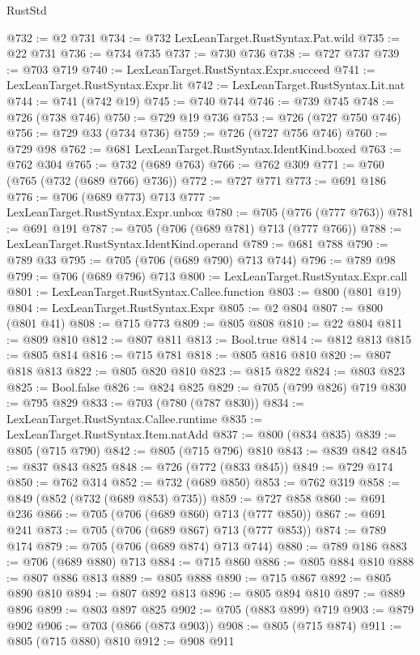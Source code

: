 \begin{lexlean}{RustStd}
\begin{coremodule}
@732 := @2 @731
@734 := @732 LexLeanTarget.RustSyntax.Pat.wild
@735 := @22 @731
@736 := @734 @735
@737 := @730 @736
@738 := @727 @737
@739 := @703 @719
@740 := LexLeanTarget.RustSyntax.Expr.succeed
@741 := LexLeanTarget.RustSyntax.Expr.lit
@742 := LexLeanTarget.RustSyntax.Lit.nat
@744 := @741 (@742 @19)
@745 := @740 @744
@746 := @739 @745
@748 := @726 (@738 @746)
@750 := @729 @19 @736
@753 := @726 (@727 @750 @746)
@756 := @729 @33 (@734 @736)
@759 := @726 (@727 @756 @746)
@760 := @729 @98
@762 := @681 LexLeanTarget.RustSyntax.IdentKind.boxed
@763 := @762 @304
@765 := @732 (@689 @763)
@766 := @762 @309
@771 := @760 (@765 (@732 (@689 @766) @736))
@772 := @727 @771
@773 := @691 @186
@776 := @706 (@689 @773) @713
@777 := LexLeanTarget.RustSyntax.Expr.unbox
@780 := @705 (@776 (@777 @763))
@781 := @691 @191
@787 := @705 (@706 (@689 @781) @713 (@777 @766))
@788 := LexLeanTarget.RustSyntax.IdentKind.operand
@789 := @681 @788
@790 := @789 @33
@795 := @705 (@706 (@689 @790) @713 @744)
@796 := @789 @98
@799 := @706 (@689 @796) @713
@800 := LexLeanTarget.RustSyntax.Expr.call
@801 := LexLeanTarget.RustSyntax.Callee.function
@803 := @800 (@801 @19)
@804 := LexLeanTarget.RustSyntax.Expr
@805 := @2 @804
@807 := @800 (@801 @41)
@808 := @715 @773
@809 := @805 @808
@810 := @22 @804
@811 := @809 @810
@812 := @807 @811
@813 := Bool.true
@814 := @812 @813
@815 := @805 @814
@816 := @715 @781
@818 := @805 @816 @810
@820 := @807 @818 @813
@822 := @805 @820 @810
@823 := @815 @822
@824 := @803 @823
@825 := Bool.false
@826 := @824 @825
@829 := @705 (@799 @826) @719
@830 := @795 @829
@833 := @703 (@780 (@787 @830))
@834 := LexLeanTarget.RustSyntax.Callee.runtime
@835 := LexLeanTarget.RustSyntax.Item.natAdd
@837 := @800 (@834 @835)
@839 := @805 (@715 @790)
@842 := @805 (@715 @796) @810
@843 := @839 @842
@845 := @837 @843 @825
@848 := @726 (@772 (@833 @845))
@849 := @729 @174
@850 := @762 @314
@852 := @732 (@689 @850)
@853 := @762 @319
@858 := @849 (@852 (@732 (@689 @853) @735))
@859 := @727 @858
@860 := @691 @236
@866 := @705 (@706 (@689 @860) @713 (@777 @850))
@867 := @691 @241
@873 := @705 (@706 (@689 @867) @713 (@777 @853))
@874 := @789 @174
@879 := @705 (@706 (@689 @874) @713 @744)
@880 := @789 @186
@883 := @706 (@689 @880) @713
@884 := @715 @860
@886 := @805 @884 @810
@888 := @807 @886 @813
@889 := @805 @888
@890 := @715 @867
@892 := @805 @890 @810
@894 := @807 @892 @813
@896 := @805 @894 @810
@897 := @889 @896
@899 := @803 @897 @825
@902 := @705 (@883 @899) @719
@903 := @879 @902
@906 := @703 (@866 (@873 @903))
@908 := @805 (@715 @874)
@911 := @805 (@715 @880) @810
@912 := @908 @911

\end{coremodule}
\end{lexlean}
